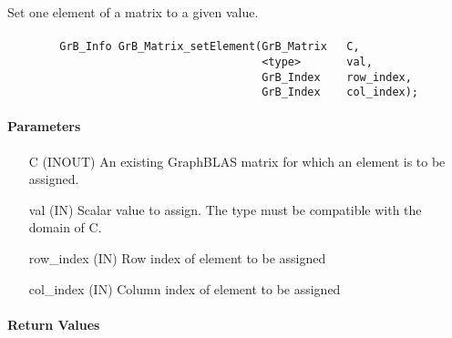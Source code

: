Set one element of a matrix to a given value.

\paragraph{\syntax}

\begin{verbatim}
        GrB_Info GrB_Matrix_setElement(GrB_Matrix   C,
                                       <type>       val,
                                       GrB_Index    row_index,
                                       GrB_Index    col_index); 
\end{verbatim}

\paragraph{Parameters}

\begin{itemize}[leftmargin=1.1in]
    \item[{\sf C}]   ({\sf INOUT}) An existing GraphBLAS matrix for which an 
    element is to be assigned.

    \item[{\sf val}]   ({\sf IN})  Scalar value to assign.  The type must
    be compatible with the domain of {\sf C}.
    
    \item[{\sf row\_index}] ({\sf IN}) Row index of element to be assigned
    \item[{\sf col\_index}] ({\sf IN}) Column index of element to be assigned
\end{itemize}

\paragraph{Return Values}

